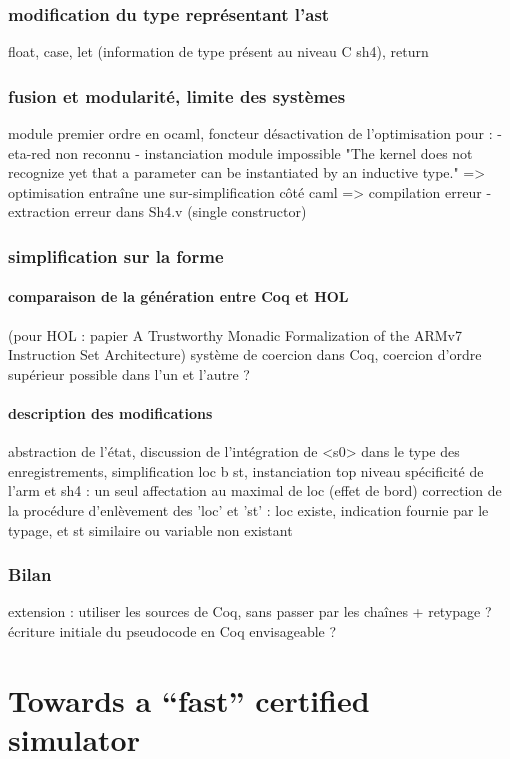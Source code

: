 \documentclass[a4paper, 11pt]{article}
\begin{document}
    \subsubsection{modification du type représentant l'ast} 
    float, case, let (information de type présent au niveau C sh4), return
    \subsubsection{fusion et modularité, limite des systèmes}
    module premier ordre en ocaml, foncteur
    désactivation de l'optimisation pour :
      - eta-red non reconnu
      - instanciation module impossible "The kernel does not recognize yet that a parameter can be instantiated by an inductive type." => optimisation entraîne une sur-simplification côté caml => compilation erreur 
      - extraction erreur dans Sh4.v (single constructor)
      
    \subsubsection{simplification sur la forme}
      \paragraph{comparaison de la génération entre Coq et HOL}
      (pour HOL : papier A Trustworthy Monadic Formalization of the
ARMv7 Instruction Set Architecture)
      système de coercion dans Coq, coercion d'ordre supérieur possible dans l'un et l'autre ?
      \paragraph{description des modifications}
      abstraction de l'état, 
      discussion de l'intégration de <s0> dans le type des enregistrements,
      simplification {loc b st}, instanciation top niveau
      spécificité de l'arm et sh4 : un seul affectation au maximal de loc (effet de bord)
      correction de la procédure d'enlèvement des 'loc' et 'st' : loc existe, indication fournie par le typage, et st similaire ou variable non existant
    \subsubsection{Bilan}
    extension : utiliser les sources de Coq, sans passer par les chaînes + retypage ?
    écriture initiale du pseudocode en Coq envisageable ?

\section{Towards a ``fast'' certified simulator}
\end{document}

